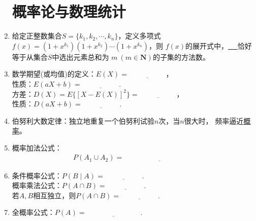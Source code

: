 \documentclass{article}
\newif\ifte
\begin{document}
\begin{multicols}{2}
\begin{enumerate}[leftmargin=20pt]
\section{概率论与数理统计}

\item 给定正整数集合$ S=\{k_1,k_2,\cdots,k_n\} $，定义多项式
$ f(x)=(1+x^{k_1})(1+x^{k_2})\cdots (1+x^{k_n}) $，则
$ f(x) $的展开式中，\underline{\ \ifte $ x^m $的系数\else 
\hspace{2cm} \fi\ }恰好等于从集合$ S $中选出元素总和为
$ m\ (m\in \textbf{N}) $的子集的方法数。

\item 数学期望(或均值)的定义：$ E(X)=\underline{\ \ifte 
\sum\limits_{i=1}^{n}x_ip_i \else \hspace{2cm} \fi\ } $，\\ 
性质：$ E(aX+b)=\underline{\ \ifte
aE(X)+b \else \hspace{2cm} \fi\ } $. \\
方差：$ D(X)=E\{[X-E(X)]^2\}=\underline{\ \ifte E(X^2)-[E(X)]^2
\else \hspace{2cm} \fi\ } $，\\ 性质：$ D(aX+b)=\underline{\ \ifte
a^2D(X) \else \hspace{2cm} \fi\ } $. 

\item 伯努利大数定律：独立地重复一个伯努利试验$ n $次，当$ n $很大时，
频率逼近\underline{概率}。

\item 概率加法公式：
\begin{gather*}
    P(A_1\cup A_2)=\underline{\ \ifte 
    P(A_1)+P(A_2)-P(A_1\cap A_2) \else \hspace{4cm} \fi\ }
\end{gather*}

\item 条件概率公式：$ P(B\mid A)=\underline{\ \ifte 
\dfrac{P(A\cap B)}{P(A)}\else \hspace{2cm} \fi\ } $. \\
概率乘法公式：$  P(A\cap B)=\underline{\ \ifte 
    P(A)P(B|A) \else \hspace{2cm} \fi\ } $. \\
若$ A,B $相互独立，则$ P(A\cap B)=\underline{\ \ifte 
    P(A)P(B) \else \hspace{2cm} \fi\ } $.

\item 全概率公式：$ P(A)=\underline{\ \ifte 
\sum\limits_{k=1}^{n} P(A \mid \varOmega_{k}) P(\varOmega_{k})
\else \hspace{3cm} \fi\ } $.


\end{enumerate}
\end{multicols}
\end{document}

